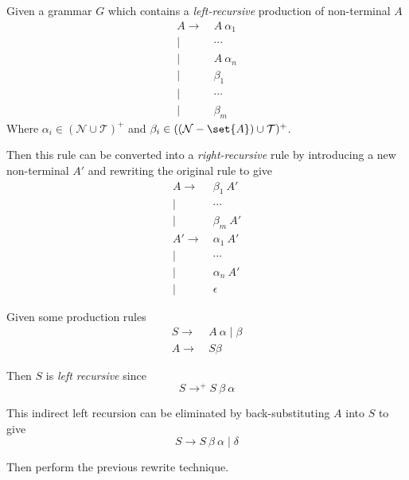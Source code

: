 \begin{definition}
    Given a grammar $G$ which contains a \textit{left-recursive} production of non-terminal $A$
    \begin{equation}
        \begin{aligned}
            A \to  &\ A\ \alpha_1 \\
              \mid &\ \cdots \\
              \mid &\ A\ \alpha_n \\
              \mid &\ \beta_1 \\
              \mid &\ \cdots \\
              \mid &\ \beta_m
        \end{aligned}
    \end{equation}
    Where $\alpha_i \in (\mathcal{N} \cup \mathcal{T})^+$ and $\beta_i \in ((\mathcal{N} - \set{A}) \cup \mathcal{T})^+$.
    
    Then this rule can be converted into a \textit{right-recursive} rule by introducing a new non-terminal $A\prime$ and rewriting the original rule to give
    \begin{equation}
        \begin{aligned}
        A \to  &\ \beta_1\ A\prime \\
          \mid &\ \cdots \\
          \mid &\ \beta_m\ A\prime \\
        A\prime \to  &\ \alpha_1\ A\prime \\
                \mid &\ \cdots \\
                \mid &\ \alpha_n\ A\prime \\
                \mid &\ \epsilon
        \end{aligned}
    \end{equation}
\end{definition}

\begin{definition}
    Given some production rules
    \begin{equation}
        \begin{aligned}
            S \to &\ A\ \alpha \mid \beta \\
            A \to &\ S \beta
        \end{aligned}
    \end{equation}
    
    Then $S$ is \textit{left recursive} since
    \begin{equation}
        S \to^+ S\ \beta\ \alpha
    \end{equation}
    
    This indirect left recursion can be eliminated by back-substituting $A$ into $S$ to give
    \begin{equation}
        S \to S\ \beta\ \alpha \mid \delta
    \end{equation}
    
    Then perform the previous rewrite technique.
\end{definition}

